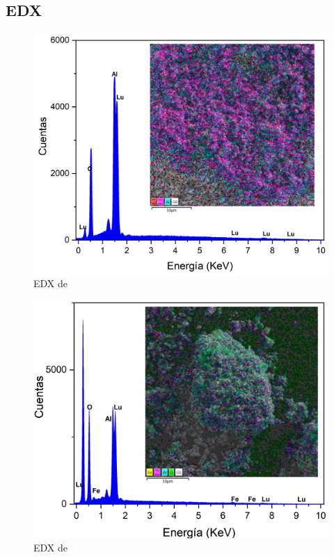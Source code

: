 \begin{appendix}
	\chapter{EDX}\label{edx}

	\begin{figure}[h]
		\centering%

		\includegraphics[width=\textwidth]{Anexos/EDXG0.png}%
		\caption{EDX de }\label{fig:edxg0}
	\end{figure}

	\begin{figure}[h]
		\centering%

		\includegraphics[width=\textwidth]{Anexos/EDXG1.png}%
		\caption{EDX de }\label{fig:edxg1}
	\end{figure}


\end{appendix}
